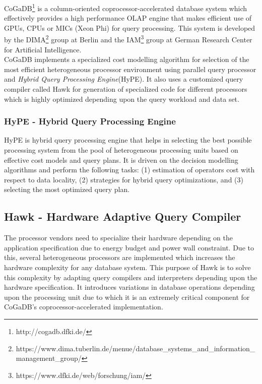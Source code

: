 CoGaDB\footnote{http://cogadb.dfki.de/} is a column-oriented coprocessor-accelerated database system which effectively provides a high performance OLAP engine that makes efficient use of GPUs, CPUs or MICs (Xeon Phi) for query processing. This system is developed by the DIMA\footnote{https://www.dima.tu\text{-}berlin.de/menue/database\_systems\_and\_information\_management\_group/} group at Berlin and the IAM\footnote{https://www.dfki.de/web/forschung/iam/} group at German Research Center for Artificial Intelligence.
\\
CoGaDB implements a specialized cost modelling algorithm for selection of the most efficient heterogeneous processor environment using parallel query processor and \emph{Hybrid Query Processing Engine}(HyPE)\cite{cogadb_hype}. It also uses a customized query compiler called Hawk\cite{cogadb_hawk} for generation of specialized code for different processors which is highly optimized depending upon the query workload and data set.

\subsubsection*{HyPE - Hybrid Query Processing Engine}
HyPE is hybrid query processing engine that helps in selecting the best possible processing system from the pool of heterogeneous processing units based on effective cost models and query plans. It is driven on the decision modelling algorithms and perform the following tasks\cite{cogadb_hype}: (1) estimation of operators cost with respect to data locality, (2) strategies for hybrid query optimizations, and (3) selecting the most optimized query plan.

\subsection*{Hawk - Hardware Adaptive Query Compiler}
The processor vendors need to specialize their hardware depending on the application specification due to energy budget and power wall\cite{microprocessors} constraint. Due to this, several heterogeneous processors are implemented which increases the hardware complexity for any database system. This purpose of Hawk\cite{cogadb_hawk} is to solve this complexity by adapting query compilers and interpreters depending upon the hardware specification. It introduces variations in database operations depending upon the processing unit due to which it is an extremely critical component for CoGaDB's coprocessor-accelerated implementation.